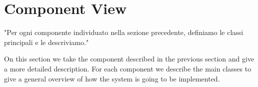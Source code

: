 \documentclass[../../../../dd.tex]{subfiles}
\begin{document}
	\section{Component View}

	"Per ogni componente individuato nella sezione precedente, definiamo le classi principali e le descriviamo."
	
	On this section we take the component described in the previous section and give a more detailed description. For each component we describe the main classes to give a general overview of how the system is going to be implemented.
		
\end{document}
